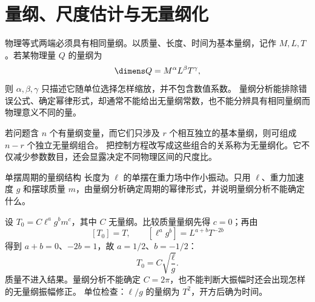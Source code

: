 \section{量纲、尺度估计与无量纲化}

物理等式两端必须具有相同量纲。以质量、长度、时间为基本量纲，记作
$M,L,T$。若某物理量 $Q$ 的量纲为
\begin{equation}
 \dimens Q=M^\alpha L^\beta T^\gamma,
\end{equation}
则 $\alpha,\beta,\gamma$ 只描述它随单位选择怎样缩放，并不包含数值系数。
量纲分析能排除错误公式、确定幂律形式，却通常不能给出无量纲常数，也不能分辨具有相同量纲而物理意义不同的量。

若问题含 $n$ 个有量纲变量，而它们只涉及 $r$ 个相互独立的基本量纲，则可组成 $n-r$ 个独立无量纲组合。
把控制方程改写成这些组合的关系称为无量纲化。它不仅减少参数数目，还会显露决定不同物理区间的尺度比。

\begin{origexamplebox}{单摆周期的量纲结构}
长度为 $\ell$ 的单摆在重力场中作小振动。只用 $\ell$、重力加速度 $g$ 和摆球质量 $m$，由量纲分析确定周期的幂律形式，并说明量纲分析不能确定什么。
\end{origexamplebox}
\begin{xesolution}
设 $T_0=C\ell^a g^b m^c$，其中 $C$ 无量纲。比较质量量纲先得 $c=0$；再由
\[
 [T_0]=T,\qquad [\ell^ag^b]=L^{a+b}T^{-2b}
\]
得到 $a+b=0$、$-2b=1$，故 $a=1/2$、$b=-1/2$：
\[
 \boxed{T_0=C\sqrt{\frac{\ell}{g}}}.
\]
质量不进入结果。量纲分析不能确定 $C=2\pi$，也不能判断大振幅时还会出现怎样的无量纲振幅修正。
单位检查：$\ell/g$ 的量纲为 $T^2$，开方后确为时间。
\end{xesolution}

